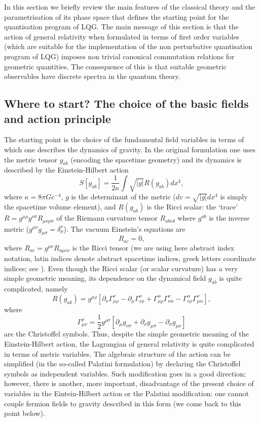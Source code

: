\documentclass[aps, nofootinbib,superscriptaddress,12pt]{revtex4-2}
\def\be{\begin{equation}}
\def\ee{\end{equation}}
\begin{document}
In this section we briefly review the main features of the classical theory and the parametrisation of its phase space that defines the starting point for the quantisation program of LQG. The main message of this section is that the action of general relativity when formulated in terms of first order variables (which are suitable for the implementation of the non perturbative quantisation program of LQG) imposes non trivial canonical commutation relations for  geometric quantities. The consequence of this is that suitable geometric observables have discrete spectra in the quantum theory. 

\subsection{Where to start? The choice of the basic fields and action principle} \label{caca}

The starting point is the choice of the fundamental field variables in terms of which one describes
the dynamics of gravity. In the original formulation one uses the metric tensor $g_{ab}$ (encoding the spacetime geometry) and its dynamics is described by the Einstein-Hilbert action \cite{Einstein:1916vd}
\be
S[g_{ab}]=\frac{1}{2\kappa} \int \sqrt{|g|} R(g_{ab}) dx^4,
\ee
where $\kappa=8\pi G c^{-4}$, $g$ is the determinant of the metric ($dv=\sqrt{|g|} dx^4$ is simply the spacetime volume element), and $R(g_{ab})$ is the Ricci scalar: the `trace' $R=g^{\mu \rho}g^{\nu \sigma}R_{\mu \nu \rho \sigma}$ of the Riemann curvature  tensor $R_{abcd}$ where $g^{ab}$ is the inverse metric ($g^{\mu\nu}g_{\mu\sigma}=\delta^\nu_\sigma$). The vacuum Einstein's equations are \be\label{ee} R_{ac}=0,\ee
where $R_{ac}=g^{\mu\nu}R_{a\mu c\nu}$ is the Ricci tensor (we are using here abstract index notation, latin indices denote abstract spacetime indices, greek letters coordinate indices; see \cite{wald}).  Even though the Ricci scalar (or scalar curvature) has a very simple geometric meaning, its dependence on the dynamical field $g_{ab}$ is quite complicated, namely
\be
R(g_{ab})=g^{\mu\rho} \left[\partial_{\nu} \Gamma^{\nu}_{\mu\rho}-\partial_{\mu} \Gamma^{\nu}_{\nu\rho}+\Gamma^{\alpha}_{\mu\rho} \Gamma^{\nu}_{\nu\alpha}-\Gamma^{\alpha}_{\nu\rho} \Gamma^{\nu}_{\mu\alpha} \right],
\ee 
where \be \label{GG}\Gamma^{\rho}_{\mu\nu}=\frac{1}{2}g^{\rho\sigma}\left[\partial_{\mu} g_{\nu\sigma} +\partial_{\nu} g_{\mu \sigma} -\partial_{\sigma} g_{\mu\nu} \right]\ee are the Christoffel symbols. Thus, despite the simple geometric meaning of the Einstein-Hilbert action, the Lagrangian of general relativity is quite complicated in terms of metric variables. The algebraic structure of the action can be simplified (in the so-called Palatini formulation) by 
declaring the Christoffel symbols as independent variables. Such modification goes in a good direction; however, there is another, more important, disadvantage of the present choice of variables in the Eintein-Hilbert action or the Palatini modification: one cannot couple fermion fields to gravity described in this form (we come back to this point below).
\end{document}
